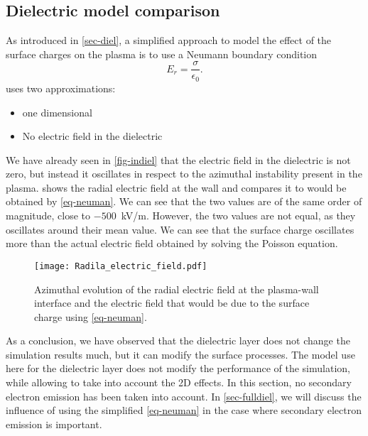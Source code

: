     
  \subsection{Dielectric model comparison} \label{subsec-modelcomp}
  
  
  As introduced in \cref{sec-diel}, a simplified approach to model the effect of the surface charges on the plasma is to use a Neumann boundary condition \citep{taccogna2019}
  \begin{equation} \label{eq-neuman}
    E_r = \frac{\sigma}{\epsilon_0}.
  \end{equation}
   uses two approximations\string:
  \begin{itemize}
    \item one dimensional
    \item No electric field in the dielectric
  \end{itemize}
  We have already seen in \cref{fig-indiel} that the electric field in the dielectric is not zero, but instead it oscillates in respect to the azimuthal instability present in the plasma.  
   shows the radial electric field at the wall and compares it to would be obtained by \cref{eq-neuman}.
  We can see that the two values are of the same order of magnitude, close to $-500$~kV/m.
  However, the two values are not equal, as they oscillates around their mean value.
  We can see that the surface charge oscillates more than the actual electric field obtained by solving the Poisson equation.

\begin{figure}[hbt]
  \centering
  \texttt{[image: Radila\_electric\_field.pdf]}
  \caption{Azimuthal evolution of the radial electric field at the plasma-wall interface and the electric field that would be due to the surface charge using \cref{eq-neuman}.}
  \label{fig-spacial_comparaison}
\end{figure}
\renewcommand\subfigurewidth{0.45\textwidth}

  As a conclusion, we have observed that the dielectric layer does not change the simulation results much, but it can modify the surface processes.
  The model use here for the dielectric layer does not modify the performance of the simulation, while allowing to take into account the \ac{2D} effects.
  In this section, no secondary electron emission has been taken into account.
  In \cref{sec-fulldiel}, we will discuss the influence of using the simplified \cref{eq-neuman} in the case where secondary electron emission is important.

  